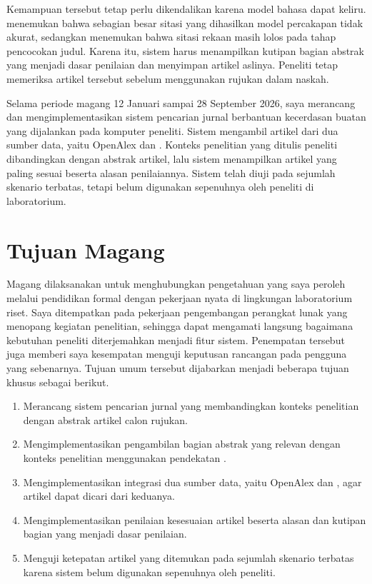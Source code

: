 Kemampuan tersebut tetap perlu dikendalikan karena model bahasa dapat keliru.
\citet{walters2023fabrication} menemukan bahwa sebagian besar sitasi yang
dihasilkan model percakapan tidak akurat, sedangkan
\citet{sari2026fabricated} menemukan bahwa sitasi rekaan masih lolos pada tahap
pencocokan judul. Karena itu, sistem harus menampilkan kutipan bagian abstrak
yang menjadi dasar penilaian dan menyimpan artikel aslinya. Peneliti tetap
memeriksa artikel tersebut sebelum menggunakan rujukan dalam naskah.

Selama periode magang 12 Januari sampai 28 September 2026, saya merancang dan
mengimplementasikan sistem pencarian jurnal berbantuan kecerdasan buatan yang
dijalankan pada komputer peneliti. Sistem mengambil artikel dari dua
sumber data, yaitu OpenAlex dan . Konteks penelitian
yang ditulis peneliti dibandingkan dengan abstrak artikel, lalu sistem
menampilkan artikel yang paling sesuai beserta alasan penilaiannya. Sistem
telah diuji pada sejumlah skenario terbatas, tetapi belum digunakan sepenuhnya
oleh peneliti di laboratorium.

\section{Tujuan Magang}

Magang dilaksanakan untuk menghubungkan pengetahuan yang saya peroleh melalui
pendidikan formal dengan pekerjaan nyata di lingkungan laboratorium riset. Saya
ditempatkan pada pekerjaan pengembangan perangkat lunak yang menopang kegiatan
penelitian, sehingga dapat mengamati langsung bagaimana kebutuhan peneliti
diterjemahkan menjadi fitur sistem. Penempatan tersebut juga memberi saya
kesempatan menguji keputusan rancangan pada pengguna yang sebenarnya.
Tujuan umum tersebut dijabarkan menjadi beberapa tujuan khusus sebagai berikut.

\begin{enumerate}
  \item Merancang sistem pencarian jurnal yang membandingkan konteks penelitian
        dengan abstrak artikel calon rujukan.
  \item Mengimplementasikan pengambilan bagian abstrak yang relevan dengan
        konteks penelitian menggunakan pendekatan .
  \item Mengimplementasikan integrasi dua sumber data, yaitu OpenAlex dan
        , agar artikel dapat dicari dari keduanya.
  \item Mengimplementasikan penilaian kesesuaian artikel beserta alasan dan
        kutipan bagian yang menjadi dasar penilaian.
  \item Menguji ketepatan artikel yang ditemukan pada sejumlah skenario
        terbatas karena sistem belum digunakan sepenuhnya oleh peneliti.
\end{enumerate}

